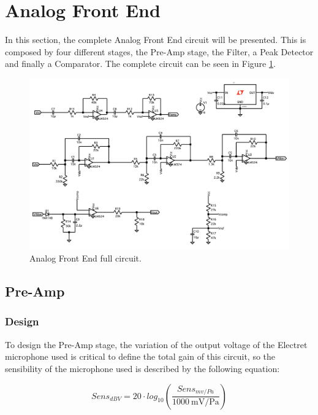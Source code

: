 \section{Analog Front End}

In this section, the complete Analog Front End circuit will be presented. This is composed by four different stages, the Pre-Amp stage, the Filter, a Peak Detector and finally a Comparator. The complete circuit can be seen in Figure \ref{fig:CompleteAFE}.

\begin{figure}[H]
    \centering
    \includegraphics*[scale = 0.45]{Images/CompleteAFE.png}
    \caption{Analog Front End full circuit.}
    \label{fig:CompleteAFE}
\end{figure}

\subsection{Pre-Amp}

\subsubsection{Design}

To design the Pre-Amp stage, the variation of the output voltage of the Electret microphone used is critical to define the total gain of this circuit, so the sensibility of the microphone used is described by the following equation:

\begin{equation}
    Sens_{dBV} = 20 \cdot log_{10} (\frac{Sens_{mv/Pa}}{\SI{1000}{\milli\volt}/\si{\pascal}})
    \label{eq:SensdBV}
\end{equation}

